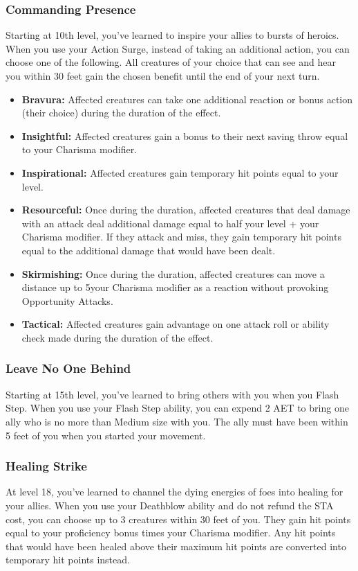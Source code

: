 \subsubsection{Commanding Presence}
Starting at 10th level, you've learned to inspire your allies to bursts of heroics. When you use your Action Surge, instead of taking an additional action, you can choose one of the following. All creatures of your choice that can see and hear you within 30 feet gain the chosen benefit until the end of your next turn.
\begin{itemize}
	\item \textbf{Bravura:} Affected creatures can take one additional reaction or bonus action (their choice) during the duration of the effect.
	\item \textbf{Insightful:} Affected creatures gain a bonus to their next saving throw equal to your Charisma modifier.
	\item \textbf{Inspirational:} Affected creatures gain temporary hit points equal to your level.
	\item \textbf{Resourceful:} Once during the duration, affected creatures that deal damage with an attack deal additional damage equal to half your level + your Charisma modifier. If they attack and miss, they gain temporary hit points equal to the additional damage that would have been dealt.
	\item \textbf{Skirmishing:} Once during the duration, affected creatures can move a distance up to 5\texttimes your Charisma modifier as a reaction without provoking Opportunity Attacks.
	\item \textbf{Tactical:} Affected creatures gain advantage on one attack roll or ability check made during the duration of the effect.
\end{itemize}

\subsubsection{Leave No One Behind}
Starting at 15th level, you've learned to bring others with you when you Flash Step. When you use your Flash Step ability, you can expend 2 AET to bring one ally who is no more than Medium size with you. The ally must have been within 5 feet of you when you started your movement.

\subsubsection{Healing Strike}
At level 18, you've learned to channel the dying energies of foes into healing for your allies. When you use your Deathblow ability and do not refund the STA cost, you can choose up to 3 creatures within 30 feet of you. They gain hit points equal to your proficiency bonus times your Charisma modifier. Any hit points that would have been healed above their maximum hit points are converted into temporary hit points instead.